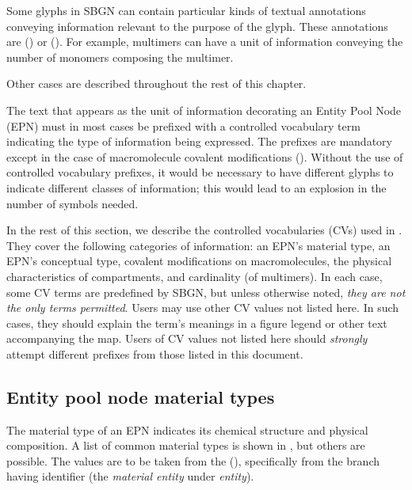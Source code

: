 Some glyphs in SBGN \PDs can contain particular kinds of textual annotations conveying information relevant to the purpose of the glyph.  These annotations are  () or   ().  For example, multimers can have a unit of information conveying the number of monomers composing the multimer. 

Other cases are described throughout the rest of this chapter.

The text that appears as the unit of information decorating an Entity Pool Node (EPN) must in most cases be prefixed with a controlled vocabulary term indicating the type of information being expressed.  The prefixes are mandatory except in the case of macromolecule covalent modifications ().  
Without the use of controlled vocabulary prefixes, it would be necessary to have different glyphs to indicate different classes of information; this would lead to an explosion in the number of symbols needed.

In the rest of this section, we describe the controlled vocabularies (CVs) used in \SBGNPDLone.  
They cover the following categories of information: an EPN's material type, an EPN's conceptual type, covalent modifications on macromolecules, the physical characteristics of compartments, and cardinality (\eg of multimers).  
In each case, some CV terms are predefined by SBGN, but unless otherwise noted, \emph{they are not the only terms permitted}.  
Users may use other CV values not listed here.
In such cases, they should explain the term's meanings in a figure legend or other text accompanying the map.
Users of CV values not listed here should \emph{strongly} attempt different prefixes from those listed in this document. 

\subsection{Entity pool node material types}
\label{sec:material-types-cv}

The material type of an EPN indicates its chemical structure and physical composition.  A list of common material types is shown in , but others are possible.  The values are to be taken from the \sbo (\sbourl), specifically from the branch having identifier  (the \emph{material entity} under \emph{entity}).

